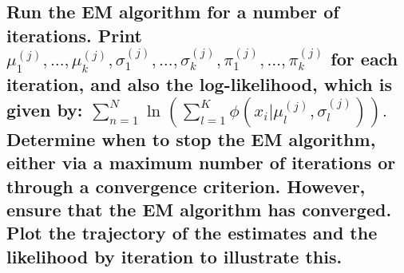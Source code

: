 \documentclass[]{article}
\begin{document}
\subsection{Run the EM algorithm for a number of iterations. Print 
	$\mu_1^{(j)}, \dots, \mu_k^{(j)}, \sigma_1^{(j)}, \dots, \sigma_k^{(j)}, \pi_1^{(j)}, \dots, \pi_k^{(j)}$ 
	for each iteration, and also the log-likelihood, which is given by:
	$
	\sum_{n=1}^{N} \ln \left( \sum_{l=1}^{K} \phi(x_i | \mu_l^{(j)}, \sigma_l^{(j)}) \right).
	$
	Determine when to stop the EM algorithm, either via a maximum number of iterations or through a convergence criterion. However, ensure that the EM algorithm has converged. Plot the trajectory of the estimates and the likelihood by iteration to illustrate this.
}





\end{document}
